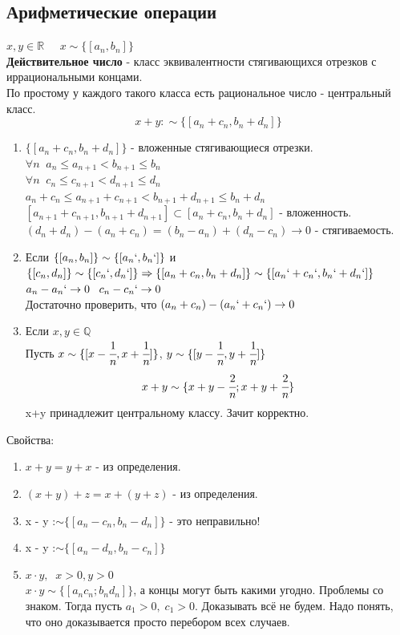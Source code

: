 \documentclass[12pt, a4paper]{article}
\newcommand{\Q}{\mathbb{Q}}
\newcommand{\R}{\mathbb{R}}
\begin{document}
\subsection{Арифметические операции}
$x, y\in \R\;\;\;\;\; x \sim \{[a_n,b_n]\}$\\
\textbf{Действительное число} - класс эквивалентности стягивающихся отрезков с иррациональными концами.\\
По простому у каждого такого класса есть рациональное число - центральный класс. \\
\[x + y :\sim \{[a_n+c_n,b_n+d_n]\} \]
\begin{tcolorbox}[title=Определим операцию сложения]
    \begin{enumerate}
        \item $\{[a_n+c_n,b_n+d_n]\}$ - вложенные стягивающиеся отрезки.
        $\forall n\;\; a_n\leq a_{n+1} < b_{n+1} \leq b_n$\\
        $\forall n\;\; c_n\leq c_{n+1} < d_{n+1} \leq d_n$\\
        $a_n+c_n\leq a_{n+1} + c_{n+1} < b_{n+1} + d_{n+1} \leq b_n + d_n$\\
        $[a_{n+1}+c_{n+1},b_{n+1}+d_{n+1}] \subset [a_n+c_n,b_n+d_n]$ - вложенность.\\
        $(d_n+d_n) - (a_n+c_n) = (b_n - a_n) + (d_n - c_n) \to 0$ - стягиваемость.
        \item Если $\{[a_n,b_n]\} \sim \{[a_n`,b_n`]\}$ и $\{[c_n,d_n]\} \sim \{[c_n`,d_n`]\} \Rightarrow \{[a_n+c_n,b_n+d_n]\} \sim \{[a_n`+c_n`,b_n`+d_n`]\}$\\
        $a_n - a_n` \to 0 \;\;\; c_n-c_n` \to 0$\\
        Достаточно проверить, что $(a_n + c_n) - (a_n` + c_n`) \to 0$
        \item Если $x,y \in \Q$\\
        Пусть $x \sim \{ [x-\cfrac{1}{n}, x+\cfrac{1}{n}] \}$, $y \sim \{ [y-\cfrac{1}{n}, y+\cfrac{1}{n}] \}$\\
        \[ x+y \sim \{x+y-\cfrac{2}{n};x+y+\cfrac{2}{n}\} \]
        x+y принадлежит центральному классу. Зачит корректно.
    \end{enumerate}
\end{tcolorbox}
Свойства:
\begin{enumerate}
    \item $ x + y = y + x $ - из определения.
    \item $ (x + y) + z = x + (y + z) $ - из определения.
    \item[3.] x - y :$\sim \{[a_n-c_n, b_n-d_n]\}$ - это неправильно!
    \item x - y :$\sim \{[a_n-d_n, b_n-c_n]\}$
    \item $x\cdot y,\;\;x>0,y>0$\\
    $x\cdot y \sim \{[a_nc_n;b_nd_n]\}$, а концы могут быть какими угодно. Проблемы со знаком. Тогда пусть $a_1>0,\;c_1>0$. Доказывать всё не будем. Надо понять, что оно доказывается просто перебором всех случаев.
\end{enumerate}
\end{document}
